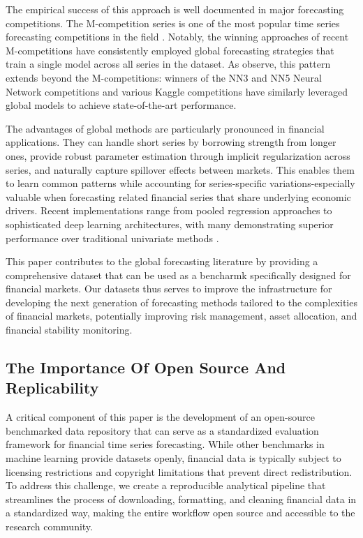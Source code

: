 \documentclass{article}
\begin{document}
The empirical success of this approach is well documented in major forecasting competitions. The M-competition series is one of the most popular time series forecasting competitions in the field \citep{Makridakis1982, Makridakis2000, Makridakis2018, Makridakis2022}. Notably, the winning approaches of recent M-competitions have consistently employed global forecasting strategies that train a single model across all series in the dataset. As \citet{Godahewa2021} observe, this pattern extends beyond the M-competitions: winners of the NN3 and NN5 Neural Network competitions and various Kaggle competitions have similarly leveraged global models to achieve state-of-the-art performance.

The advantages of global methods are particularly pronounced in financial applications. They can handle short series by borrowing strength from longer ones, provide robust parameter estimation through implicit regularization across series, and naturally capture spillover effects between markets. This enables them to learn common patterns while accounting for series-specific variations-especially valuable when forecasting related financial series that share underlying economic drivers. Recent implementations range from pooled regression approaches to sophisticated deep learning architectures, with many demonstrating superior performance over traditional univariate methods \citep{Godahewa2021}.

This paper contributes to the global forecasting literature by providing a comprehensive dataset that can be used as a bencharmk specifically designed for financial markets.
Our datasets thus serves to improve the infrastructure for developing the next generation of forecasting methods tailored to the complexities of financial markets, potentially improving risk management, asset allocation, and financial stability monitoring.



\subsection{The Importance Of Open Source And Replicability}

A critical component of this paper is the development of an open-source benchmarked data repository that can serve as a standardized evaluation framework for financial time series forecasting. While other benchmarks in machine learning provide datasets openly, financial data is typically subject to licensing restrictions and copyright limitations that prevent direct redistribution. To address this challenge, we create a reproducible analytical pipeline that streamlines the process of downloading, formatting, and cleaning financial data in a standardized way, making the entire workflow open source and accessible to the research community.
\end{document}
